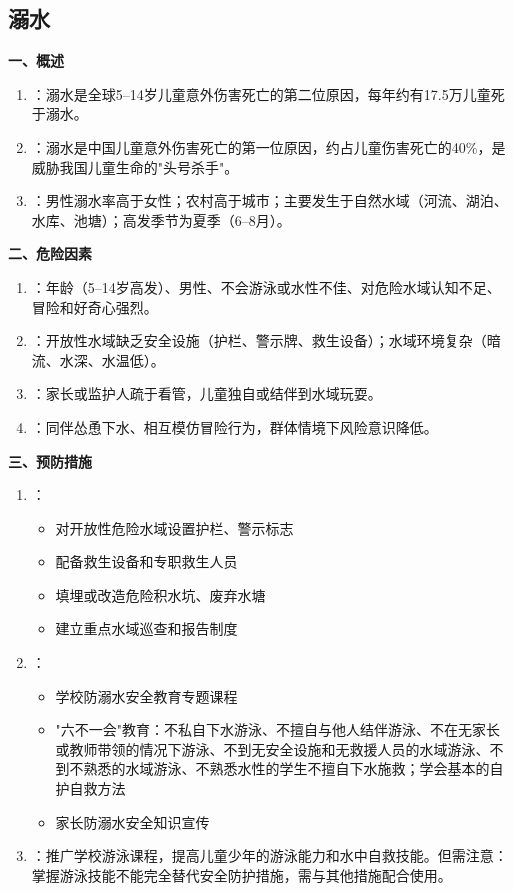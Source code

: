 \subsection{溺水}

\begin{keybox}
\textbf{一、概述}
\begin{enumerate}[leftmargin=*]
    \item {}：溺水是全球5--14岁儿童意外伤害死亡的第二位原因，每年约有17.5万儿童死于溺水。
    \item {}：溺水是中国儿童意外伤害死亡的第一位原因，约占儿童伤害死亡的40\%，是威胁我国儿童生命的"头号杀手"。
    \item {}：男性溺水率高于女性；农村高于城市；主要发生于自然水域（河流、湖泊、水库、池塘）；高发季节为夏季（6--8月）。
\end{enumerate}

\textbf{二、危险因素}
\begin{enumerate}[leftmargin=*]
    \item {}：年龄（5--14岁高发）、男性、不会游泳或水性不佳、对危险水域认知不足、冒险和好奇心强烈。
    \item {}：开放性水域缺乏安全设施（护栏、警示牌、救生设备）；水域环境复杂（暗流、水深、水温低）。
    \item {}：家长或监护人疏于看管，儿童独自或结伴到水域玩耍。
    \item {}：同伴怂恿下水、相互模仿冒险行为，群体情境下风险意识降低。
\end{enumerate}

\textbf{三、预防措施}
\begin{enumerate}[leftmargin=*]
    \item {}：
    \begin{itemize}
        \item 对开放性危险水域设置护栏、警示标志
        \item 配备救生设备和专职救生人员
        \item 填埋或改造危险积水坑、废弃水塘
        \item 建立重点水域巡查和报告制度
    \end{itemize}
    \item {}：
    \begin{itemize}
        \item 学校防溺水安全教育专题课程
        \item "六不一会"教育：不私自下水游泳、不擅自与他人结伴游泳、不在无家长或教师带领的情况下游泳、不到无安全设施和无救援人员的水域游泳、不到不熟悉的水域游泳、不熟悉水性的学生不擅自下水施救；学会基本的自护自救方法
        \item 家长防溺水安全知识宣传
    \end{itemize}
    \item {}：推广学校游泳课程，提高儿童少年的游泳能力和水中自救技能。但需注意：掌握游泳技能不能完全替代安全防护措施，需与其他措施配合使用。
\end{enumerate}
\end{keybox}

